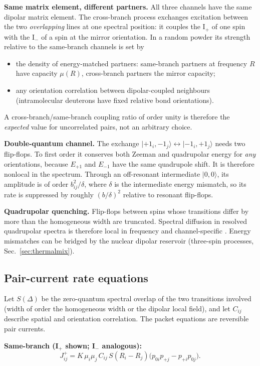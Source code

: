 \documentclass[11pt]{article}
\newcommand{\ket}[1]{\lvert #1\rangle}
\begin{document}
\textbf{Same matrix element, different partners.} All three channels have the same dipolar
matrix element. The cross-branch process exchanges excitation between the two
\emph{overlapping} lines at one spectral position: it couples the I$_+$ of one spin with the
I$_-$ of a spin at the mirror orientation. In a random powder its strength relative to the
same-branch channels is set by
\begin{itemize}
\item the density of energy-matched partners: same-branch partners at frequency $R$ have
capacity $\mu(R)$, cross-branch partners the mirror capacity;
\item any orientation correlation between dipolar-coupled neighbours (intramolecular
deuterons have fixed relative bond orientations).
\end{itemize}
A cross-branch/same-branch coupling ratio of order unity is therefore the \emph{expected}
value for uncorrelated pairs, not an arbitrary choice.

\textbf{Double-quantum channel.} The exchange
$\ket{{+1}_i,{-1}_j}\leftrightarrow\ket{{-1}_i,{+1}_j}$ needs two flip-flops. To first order
it conserves both Zeeman and quadrupolar energy for \emph{any} orientations, because $E_{+1}$
and $E_{-1}$ have the same quadrupole shift. It is therefore nonlocal in the spectrum. Through
an off-resonant intermediate $\ket{0,0}$, its amplitude is of order $b_{ij}^2/\delta$, where
$\delta$ is the intermediate energy mismatch, so its rate is suppressed by roughly
$(b/\delta)^2$ relative to resonant flip-flops.

\textbf{Quadrupolar quenching.} Flip-flops between spins whose transitions differ by more than
the homogeneous width are truncated. Spectral diffusion in resolved quadrupolar spectra is
therefore local in frequency and channel-specific \cite{SuterErnst1985}. Energy mismatches can
be bridged by the nuclear dipolar reservoir (three-spin processes, Sec.~\ref{sec:thermalmix}).

\subsection{Pair-current rate equations}
Let $S(\Delta)$ be the zero-quantum spectral overlap of the two transitions involved (width of
order the homogeneous width or the dipolar local field), and let $C_{ij}$ describe spatial and
orientation correlation. The packet equations are reversible pair currents.

\textbf{Same-branch (I$_+$ shown; I$_-$ analogous):}
\begin{equation}
J^{+}_{ij}=K\,\mu_i\mu_j\,C_{ij}\,S(R_i-R_j)\big(p_{0i}p_{+j}-p_{+i}p_{0j}\big).
\end{equation}
\end{document}
